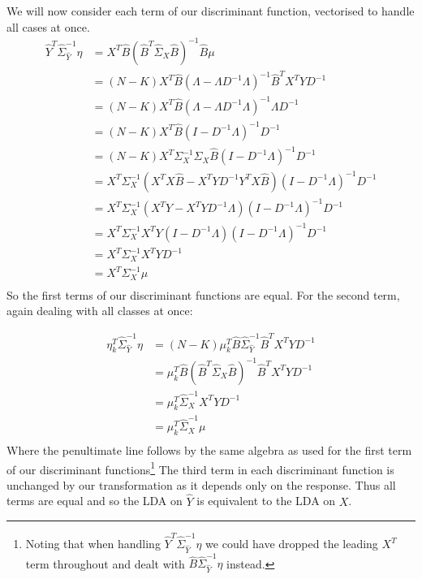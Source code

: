 We will now consider each term of our discriminant function, vectorised to handle all cases at once.
\begin{align*}
    \hat{Y}^T \hat{\Sigma}_{\hat{Y}}^{-1} \eta &=  X^T \hat{B}  \left(\hat{B}^T \hat{\Sigma}_X\hat{B}\right)^{-1} \hat{B} \mu\\ 
    &=  (N-K) 
    X^T \hat{B}  \left(\Lambda - \Lambda D^{-1}\Lambda \right)^{-1} \hat{B}^T X^T Y D^{-1}\\
    &=  (N-K) X^T \hat{B}  \left(\Lambda - \Lambda D^{-1}\Lambda \right)^{-1} \Lambda D^{-1}\\
    &=  (N-K) X^T \hat{B}  \left(I - D^{-1}\Lambda \right)^{-1}  D^{-1}\\
    &=  (N-K) X^T \Sigma_X^{-1} \Sigma_X \hat{B}  \left(I - D^{-1}\Lambda \right)^{-1}  D^{-1}\\
    &=  X^T \Sigma_X^{-1} \left( X^T X \hat{B} - X^T Y D^{-1} Y^T X \hat{B}\right)   \left(I - D^{-1}\Lambda \right)^{-1}  D^{-1}\\
    &=  X^T \Sigma_X^{-1} \left( X^T Y - X^T Y D^{-1} \Lambda \right)   \left(I - D^{-1}\Lambda \right)^{-1}  D^{-1}\\
    &=  X^T \Sigma_X^{-1} X^T Y \left( I - D^{-1} \Lambda \right)   \left(I - D^{-1}\Lambda \right)^{-1}  D^{-1}\\
    &=  X^T \Sigma_X^{-1} X^T Y   D^{-1}\\
    &=  X^T \Sigma_X^{-1} \mu\\
\end{align*}
So the first terms of our discriminant functions are equal. For the second term, again dealing with all classes at once:

\begin{align*}
    \eta_k^T \hat{\Sigma}_{\hat{Y}}^{-1}\eta &= \left(N-K\right) \mu_k^T \hat{B} \hat{\Sigma}_{\hat{Y}}^{-1} \hat{B}^T X^T Y D^{-1}\\
    &=  \mu_k^T \hat{B} \left(\hat{B}^T\hat{\Sigma}_{X} \hat{B} \right)^{-1} \hat{B}^T X^T Y D^{-1}\\
    &= \mu_k^T \hat{\Sigma}_{X}^{-1} X^T Y D^{-1}\\
     &= \mu_k^T \hat{\Sigma}_{X}^{-1} \mu\\
\end{align*}
Where the penultimate line follows by the same algebra as used for the first term of our discriminant functions\footnote{Noting that when handling $\hat{Y}^T \hat{\Sigma}_{\hat{Y}}^{-1} \eta$ we could have dropped the leading $X^T$ term throughout and dealt with $\hat{B} \hat{\Sigma}_{\hat{Y}}^{-1} \eta$ instead.}
The third term in each discriminant function is unchanged by our transformation as it depends only on the response. Thus all terms are equal and so the LDA on $\hat{Y}$ is equivalent to the LDA on $X$.


